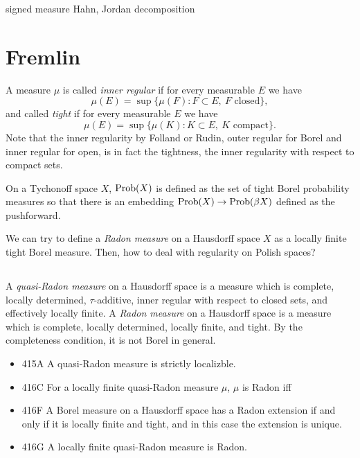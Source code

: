 \documentclass{../../large}
\begin{document}
\begin{prb}

signed measure
Hahn, Jordan decomposition

\end{prb}




\section*{Fremlin}


A measure $\mu$ is called \emph{inner regular} if for every measurable $E$ we have
\[\mu(E)=\sup\{\mu(F):F\subset E,\ \text{$F$ closed}\},\]
and called \emph{tight} if for every measurable $E$ we have
\[\mu(E)=\sup\{\mu(K):K\subset E,\ \text{$K$ compact}\}.\]
Note that the inner regularity by Folland or Rudin, outer regular for Borel and inner regular for open, is in fact the tightness, the inner regularity with respect to compact sets.

On a Tychonoff space $X$, $\operatorname{Prob}(X)$ is defined as the set of tight Borel probability measures so that there is an embedding $\operatorname{Prob}(X)\to\operatorname{Prob}(\beta X)$ defined as the pushforward.

We can try to define a \emph{Radon measure} on a Hausdorff space $X$ as a locally finite tight Borel measure.
Then, how to deal with regularity on Polish spaces?

\subsection{}



A \emph{quasi-Radon measure} on a Hausdorff space is a measure which is complete, locally determined, $\tau$-additive, inner regular with respect to closed sets, and effectively locally finite.
A \emph{Radon measure} on a Hausdorff space is a measure which is complete, locally determined, locally finite, and tight.
By the completeness condition, it is not Borel in general.
\begin{itemize}
\item 415A A quasi-Radon measure is strictly localizble.
\item 416C For a locally finite quasi-Radon measure $\mu$, $\mu$ is Radon iff 
\item 416F A Borel measure on a Hausdorff space has a Radon extension if and only if it is locally finite and tight, and in this case the extension is unique.
\item 416G A locally finite quasi-Radon measure is Radon.
\end{itemize}
\end{document}
